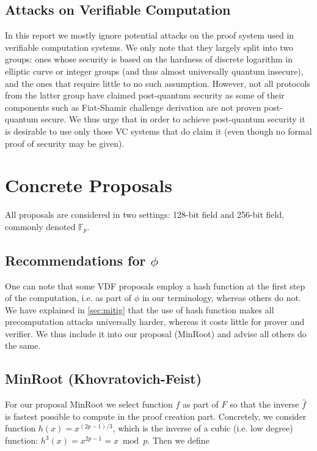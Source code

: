 \documentclass{article}
\begin{document}
\subsection{Attacks on Verifiable Computation}

In this report we mostly ignore potential attacks on the proof system used in verifiable computation systems. We only note that they largely split into two groups: ones whose security is based on the hardness of discrete logarithm in elliptic curve or integer groups (and thus almost universally quantum insecure), and the ones that require little to no such assumption. However, not all protocols from the latter group have claimed post-quantum security as some of their components such as Fiat-Shamir challenge derivation are not proven post-quantum secure. We thus urge that in order to achieve post-quantum security it is desirable to use only those VC systems that do claim it (even though no formal proof of security may be given).


\section{Concrete Proposals}\label{sec:proposal}

All proposals are considered in two settings: 128-bit field and 256-bit field, commonly denoted $\mathbb{F}_p$.

\subsection{Recommendations for $\phi$}

One can note that some VDF proposals employ a hash function at the first step of the computation, i.e. as part of $\phi$ in our terminology, whereas others do not. We have explained in \cref{sec:mitig} that the use of hash function makes all precomputation attacks universally harder, whereas it costs little for prover and verifier. We thus include it into our proposal (MinRoot) and advise all others do the same.

\subsection{MinRoot  (Khovratovich-Feist)}

For our proposal MinRoot we select function $f$ as part of $F$ so that the inverse $\widehat{f}$ is fastest possible to compute in the proof creation part. Concretely, we consider function $h(x) = x^{(2p-1)/3}$, which is the inverse of a cubic (i.e. low degree) function: $h^3(x) = x^{2p-1} = x\bmod{p}$. Then we define
\end{document}
